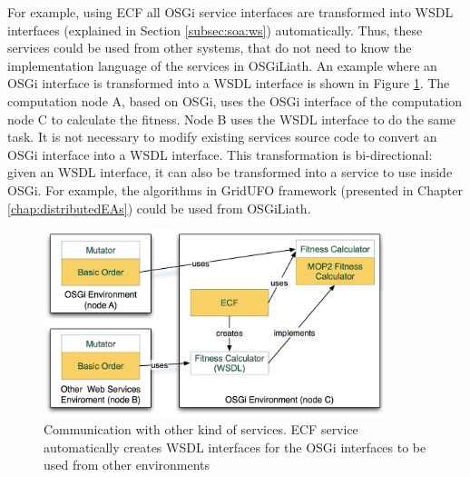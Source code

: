 For example, using ECF all OSGi service interfaces are
transformed into WSDL  interfaces (explained in Section \ref{subsec:soa:ws}) automatically. %
Thus, these services could be used from other systems, that do not
need to know the implementation language of the services in
OSGiLiath. An example where an OSGi interface is transformed into a
WSDL interface is shown in Figure \ref{AXISFIGURE}. %
The computation
node A, based on OSGi, uses the OSGi interface of the computation node
C to calculate the fitness. Node B uses the WSDL interface to do the
same task. It is not necessary to modify existing services source code
to convert an OSGi interface into a WSDL interface. This
transformation is bi-directional: given an WSDL interface, it can also
be transformed into a service to use inside OSGi. For example, the
algorithms in GridUFO framework (presented in Chapter
\ref{chap:distributedEAs}) could be used from OSGiLiath. %






\begin{figure}
\centering
\includegraphics[width=10cm]{gfx/osgiliath/axis.png}


\caption{Communication with other kind of services. ECF service automatically creates WSDL interfaces for the OSGi interfaces to be used from other environments}
\label{AXISFIGURE}
\end{figure}

